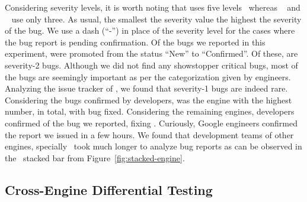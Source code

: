 \documentclass[10pt,conference,anonymous]{IEEEtran}
\begin{document}
Considering severity levels, it is worth noting that \jsc{} uses five
levels~\cite{jsc-severity} whereas \chakra{}~\cite{chakra-severity}
and \smonkey{}~\cite{mozilla-severity} use only three. As
usual, the smallest the severity value the highest the severity of the
bug. We use a dash (``-'') in place of the severity level for the
cases where the bug report is pending confirmation. Of
the  bugs we reported in this experiment,  were
promoted from the status ``New'' to ``Confirmed''. Of these, 
are severity-2 bugs.  Although we did not find any showstopper
critical bugs, most of the bugs are seemingly important as per the
categorization given by engineers. Analyzing the issue tracker of
\chakra, we found that severity-1 bugs are indeed rare. Considering
the bugs confirmed by developers, \chakra{} was the engine with the
highest number,  in total, with  bug fixed. Considering
the remaining engines, \veight{} developers confirmed  of the
 bug we reported, fixing . Curiously, Google
engineers confirmed the report we issued in a few hours. We found that
development teams of other engines, specially \jsc\, took much longer
to analyze bug reports as can be observed in the \jsc\ stacked bar
from Figure~\ref{fig:stacked-engine}.


\begin{center}
\end{center}


\subsection{Cross-Engine Differential Testing}
\label{sec:cross-engine-diff-testing-results}
\end{document}
